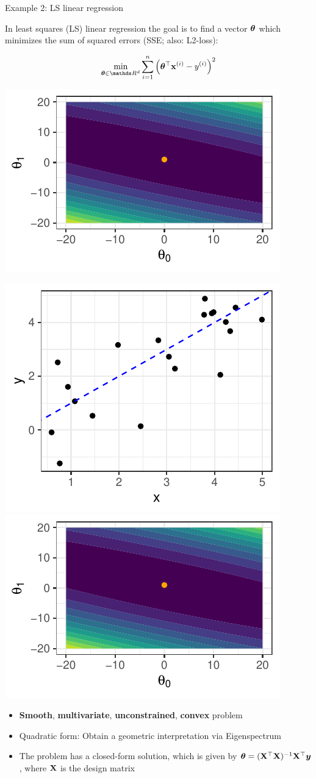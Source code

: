 \documentclass[11pt,compress,t,notes=noshow, xcolor=table]{beamer}
\begin{document}
\begin{vbframe}{Example 2: LS linear regression} 


In least squares (LS) linear regression the goal is to find a vector $\bm{\theta}$ which minimizes the sum of squared errors (SSE; also: L2-loss): 

$$
\min_{\thetab \in \R^d} \sum_{i = 1}^n \left(\thetab^\top \xi - \yi\right)^2
$$

\begin{center}
	\includegraphics[height=0.30\textwidth, keepaspectratio]{figure_man/ml_linreg_example_2.pdf}
\end{center}

\framebreak 

\begin{center}
	\includegraphics[height=0.30\textwidth, keepaspectratio]{figure_man/ml_linreg_example_1.pdf} ~~ \includegraphics[height=0.30\textwidth, keepaspectratio]{figure_man/ml_linreg_example_2.pdf}
\end{center}

\begin{itemize}
	\item \textbf{Smooth}, \textbf{multivariate}, \textbf{unconstrained}, \textbf{convex} problem
	\item Quadratic form: Obtain a geometric interpretation via Eigenspectrum
	\item The problem has a closed-form solution, which is given by $\bm{\theta} = (\mathbf{X}^\top \mathbf{X})^{-1}\mathbf{X}^\top \bm{y}$, where $\mathbf{X}$ is the design matrix
\end{itemize}

\end{vbframe}
\end{document}
